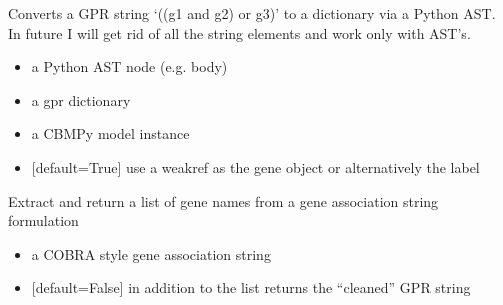 \documentclass[letterpaper,10pt,english]{sphinxmanual}
\begin{document}
\begin{fulllineitems}
\label{\detokenize{modules_doc:cbmpy.CBCommon.createAssociationDictFromNode}}
\pysigstartsignatures
{}
\pysigstopsignatures
\sphinxAtStartPar
Converts a GPR string ‘((g1 and g2) or g3)’ to a dictionary via a Python AST.
In future I will get rid of all the string elements and work only with AST’s.
\begin{itemize}
\item {} 
\sphinxAtStartPar
{} a Python AST node (e.g. body)

\item {} 
\sphinxAtStartPar
{} a gpr dictionary

\item {} 
\sphinxAtStartPar
{} a CBMPy model instance

\item {} 
\sphinxAtStartPar
{} {[}default=True{]} use a weakref as the gene object or alternatively the label

\end{itemize}

\end{fulllineitems}


\begin{fulllineitems}
\label{\detokenize{modules_doc:cbmpy.CBCommon.extractGeneIdsFromString}}
\pysigstartsignatures
{}
\pysigstopsignatures
\sphinxAtStartPar
Extract and return a list of gene names from a gene association string formulation
\begin{itemize}
\item {} 
\sphinxAtStartPar
{} a COBRA style gene association string

\item {} 
\sphinxAtStartPar
{} {[}default=False{]} in addition to the list returns the “cleaned” GPR string

\end{itemize}

\end{fulllineitems}
\end{document}
